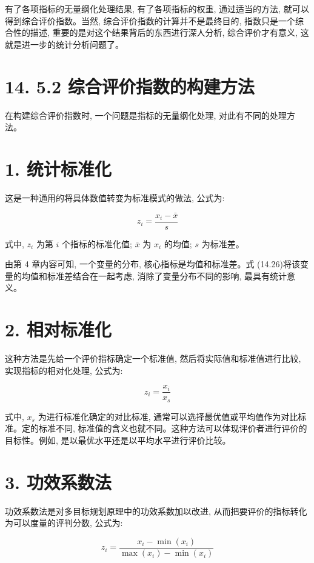 \documentclass[10pt]{article}
\begin{document}
\begin{CJK*}{UTF8}{bsmi}
有了各项指标的无量纲化处理结果, 有了各项指标的权重, 通过适当的方法, 就可以得到综合评价指数。当然, 综合评价指数的计算并不是最终目的, 指数只是一个综合性的描述, 重要的是对这个结果背后的东西进行深人分析, 综合评价才有意义, 这就是进一步的统计分析问题了。

\section*{14. 5.2 综合评价指数的构建方法}
在构建综合评价指数时, 一个问题是指标的无量纲化处理, 对此有不同的处理方法。

\section*{1. 统计标准化}
这是一种通用的将具体数值转变为标准模式的做法, 公式为:


\begin{equation*}
z_{i}=\frac{x_{i}-\bar{x}}{s} \tag{14.26}
\end{equation*}


式中, $z_{i}$ 为第 $i$ 个指标的标准化值; $\bar{x}$ 为 $x_{i}$ 的均值; $s$ 为标准差。

由第 4 章内容可知, 一个变量的分布, 核心指标是均值和标准差。式 (14.26)将该变量的均值和标准差结合在一起考虑, 消除了变量分布不同的影响, 最具有统计意义。

\section*{2. 相对标准化}
这种方法是先给一个评价指标确定一个标准值, 然后将实际值和标准值进行比较, 实现指标的相对化处理, 公式为:


\begin{equation*}
z_{i}=\frac{x_{i}}{x_{s}} \tag{14.27}
\end{equation*}


式中, $x_{s}$ 为进行标准化确定的对比标准, 通常可以选择最优值或平均值作为对比标准。定的标准不同, 标准值的含义也就不同。这种方法可以体现评价者进行评价的目标性。例如, 是以最优水平还是以平均水平进行评价比较。

\section*{3. 功效系数法}
功效系数法是对多目标规划原理中的功效系数加以改进, 从而把要评价的指标转化为可以度量的评判分数, 公式为:


\begin{equation*}
z_{i}=\frac{x_{i}-\min \left(x_{i}\right)}{\max \left(x_{i}\right)-\min \left(x_{i}\right)} \tag{14.28}
\end{equation*}



\end{CJK*}
\end{document}
